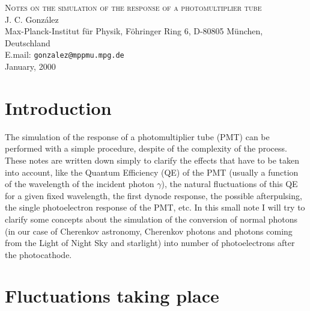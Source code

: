 \documentclass{article}
\def\Cherenkov{Cherenkov\xspace}
\begin{document}
\begin{center}
  {\large \scshape 
  Notes on the simulation of the response of a photomultiplier tube\\}
  J. C. Gonz\'alez\\
  {\small Max-Planck-Institut f\"ur Physik, 
  F\"ohringer Ring 6, D-80805 M\"unchen, Deutschland\\
  E.mail: \texttt{gonzalez@mppmu.mpg.de}\\}
  January, 2000
\end{center}


\begin{abstract}
  The simulation of the response of a photomultiplier tube (PMT) can
  be performed with a simple procedure, despite of its complexity. One
  just has to have very clear the nature of the whole process, step by
  step. In this small notes I try to clarify the physical processes
  involved.
\end{abstract}


\section*{Introduction}

The simulation of the response of a photomultiplier tube (PMT) can be
performed with a simple procedure, despite of the complexity of the
process. These notes are written down simply to clarify the effects
that have to be taken into account, like the Quantum Efficiency (QE)
of the PMT (usually a function of the wavelength of the incident
photon $\gamma$), the natural fluctuations of this QE for a given
fixed wavelength, the first dynode response, the possible
afterpulsing, the single photoelectron response of the PMT, etc. In
this small note I will try to clarify some concepts about the
simulation of the conversion of normal photons (in our case of
\Cherenkov astronomy, \Cherenkov photons and photons coming from the
Light of Night Sky and starlight) into number of photoelectrons after
the photocathode.


\section{Fluctuations taking place}
\end{document}

